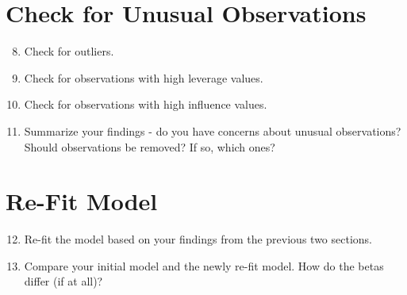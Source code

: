 \documentclass{tufte-handout}
\begin{document}
\vspace{3mm}
\section{Check for Unusual Observations}
\begin{enumerate}
\setcounter{enumi}{7}
\item Check for outliers.
\item Check for observations with high leverage values.
\item Check for observations with high influence values.
\item Summarize your findings - do you have concerns about unusual observations? Should observations be removed? If so, which ones?
\end{enumerate}

\vspace{3mm}
\section{Re-Fit Model}
\begin{enumerate}
\setcounter{enumi}{11}
\item Re-fit the model based on your findings from the previous two sections. 
\item Compare your initial model and the newly re-fit model. How do the betas differ (if at all)? 
\end{enumerate}

\end{document}
